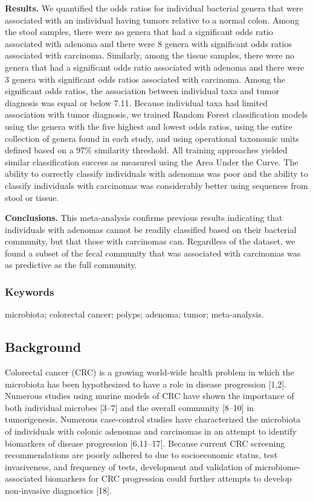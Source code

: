\documentclass[12pt,]{article}
\begin{document}
\textbf{Results.} We quantified the odds ratios for individual bacterial
genera that were associated with an individual having tumors relative to
a normal colon. Among the stool samples, there were no genera that had a
significant odds ratio associated with adenoma and there were 8 genera
with significant odds ratios associated with carcinoma. Similarly, among
the tissue samples, there were no genera that had a significant odds
ratio associated with adenoma and there were 3 genera with significant
odds ratios associated with carcinoma. Among the significant odds
ratios, the association between individual taxa and tumor diagnosis was
equal or below 7.11. Because individual taxa had limited association
with tumor diagnosis, we trained Random Forest classification models
using the genera with the five highest and lowest odds ratios, using the
entire collection of genera found in each study, and using operational
taxonomic units defined based on a 97\% similarity threshold. All
training approaches yielded similar classification success as measured
using the Area Under the Curve. The ability to correctly classify
individuals with adenomas was poor and the ability to classify
individuals with carcinomas was considerably better using sequences from
stool or tissue.

\textbf{Conclusions.} This meta-analysis confirms previous results
indicating that individuals with adenomas cannot be readily classified
based on their bacterial community, but that those with carcinomas can.
Regardless of the dataset, we found a subset of the fecal community that
was associated with carcinomas was as predictive as the full community.

\subsubsection{Keywords}\label{keywords}

microbiota; colorectal cancer; polyps; adenoma; tumor; meta-analysis.

\newpage

\subsection{Background}\label{background}

Colorectal cancer (CRC) is a growing world-wide health problem in which
the microbiota has been hypothesized to have a role in disease
progression {[}1,2{]}. Numerous studies using murine models of CRC have
shown the importance of both individual microbes {[}3--7{]} and the
overall community {[}8--10{]} in tumorigenesis. Numerous case-control
studies have characterized the microbiota of individuals with colonic
adenomas and carcinomas in an attempt to identify biomarkers of disease
progression {[}6,11--17{]}. Because current CRC screening
recommendations are poorly adhered to due to socioeconomic status, test
invasiveness, and frequency of tests, development and validation of
microbiome-associated biomarkers for CRC progression could further
attempts to develop non-invasive diagnostics {[}18{]}.
\end{document}
